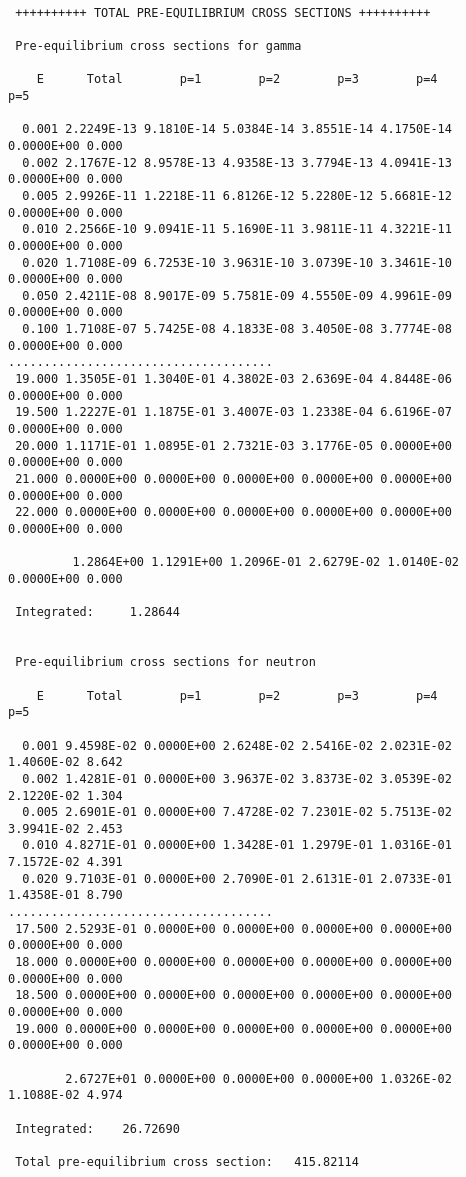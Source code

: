 \begin{samplecase}
{\small \begin{verbatim}

 ++++++++++ TOTAL PRE-EQUILIBRIUM CROSS SECTIONS ++++++++++
  
 Pre-equilibrium cross sections for gamma
  
    E      Total        p=1        p=2        p=3        p=4        p=5        

  0.001 2.2249E-13 9.1810E-14 5.0384E-14 3.8551E-14 4.1750E-14 0.0000E+00 0.000
  0.002 2.1767E-12 8.9578E-13 4.9358E-13 3.7794E-13 4.0941E-13 0.0000E+00 0.000
  0.005 2.9926E-11 1.2218E-11 6.8126E-12 5.2280E-12 5.6681E-12 0.0000E+00 0.000
  0.010 2.2566E-10 9.0941E-11 5.1690E-11 3.9811E-11 4.3221E-11 0.0000E+00 0.000
  0.020 1.7108E-09 6.7253E-10 3.9631E-10 3.0739E-10 3.3461E-10 0.0000E+00 0.000
  0.050 2.4211E-08 8.9017E-09 5.7581E-09 4.5550E-09 4.9961E-09 0.0000E+00 0.000
  0.100 1.7108E-07 5.7425E-08 4.1833E-08 3.4050E-08 3.7774E-08 0.0000E+00 0.000
.....................................
 19.000 1.3505E-01 1.3040E-01 4.3802E-03 2.6369E-04 4.8448E-06 0.0000E+00 0.000
 19.500 1.2227E-01 1.1875E-01 3.4007E-03 1.2338E-04 6.6196E-07 0.0000E+00 0.000
 20.000 1.1171E-01 1.0895E-01 2.7321E-03 3.1776E-05 0.0000E+00 0.0000E+00 0.000
 21.000 0.0000E+00 0.0000E+00 0.0000E+00 0.0000E+00 0.0000E+00 0.0000E+00 0.000
 22.000 0.0000E+00 0.0000E+00 0.0000E+00 0.0000E+00 0.0000E+00 0.0000E+00 0.000

         1.2864E+00 1.1291E+00 1.2096E-01 2.6279E-02 1.0140E-02 0.0000E+00 0.000

 Integrated:     1.28644


 Pre-equilibrium cross sections for neutron

    E      Total        p=1        p=2        p=3        p=4        p=5        

  0.001 9.4598E-02 0.0000E+00 2.6248E-02 2.5416E-02 2.0231E-02 1.4060E-02 8.642
  0.002 1.4281E-01 0.0000E+00 3.9637E-02 3.8373E-02 3.0539E-02 2.1220E-02 1.304
  0.005 2.6901E-01 0.0000E+00 7.4728E-02 7.2301E-02 5.7513E-02 3.9941E-02 2.453
  0.010 4.8271E-01 0.0000E+00 1.3428E-01 1.2979E-01 1.0316E-01 7.1572E-02 4.391
  0.020 9.7103E-01 0.0000E+00 2.7090E-01 2.6131E-01 2.0733E-01 1.4358E-01 8.790
.....................................
 17.500 2.5293E-01 0.0000E+00 0.0000E+00 0.0000E+00 0.0000E+00 0.0000E+00 0.000
 18.000 0.0000E+00 0.0000E+00 0.0000E+00 0.0000E+00 0.0000E+00 0.0000E+00 0.000
 18.500 0.0000E+00 0.0000E+00 0.0000E+00 0.0000E+00 0.0000E+00 0.0000E+00 0.000
 19.000 0.0000E+00 0.0000E+00 0.0000E+00 0.0000E+00 0.0000E+00 0.0000E+00 0.000

        2.6727E+01 0.0000E+00 0.0000E+00 0.0000E+00 1.0326E-02 1.1088E-02 4.974

 Integrated:    26.72690

 Total pre-equilibrium cross section:   415.82114
\end{verbatim} } \renewcommand{\baselinestretch}{1.07}\small\normalsize
\end{samplecase}
